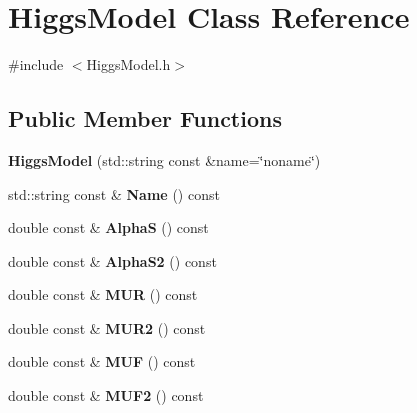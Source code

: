 \hypertarget{classHiggsModel}{}\section{Higgs\+Model Class Reference}
\label{classHiggsModel}


{\ttfamily \#include $<$Higgs\+Model.\+h$>$}

\subsection*{Public Member Functions}
\begin{DoxyCompactItemize}
\item 
\hypertarget{classHiggsModel_aa6f39f73df22008fa639fd64653cc8e2}{}{\bfseries Higgs\+Model} (std\+::string const \&name=\char`\"{}noname\char`\"{})\label{classHiggsModel_aa6f39f73df22008fa639fd64653cc8e2}

\item 
\hypertarget{classHiggsModel_a29a94aee623c9ce8d874b8b4fba17835}{}std\+::string const \& {\bfseries Name} () const \label{classHiggsModel_a29a94aee623c9ce8d874b8b4fba17835}

\item 
\hypertarget{classHiggsModel_a343a0ea0a7a22e78c3504dc64d4d6184}{}double const \& {\bfseries Alpha\+S} () const \label{classHiggsModel_a343a0ea0a7a22e78c3504dc64d4d6184}

\item 
\hypertarget{classHiggsModel_a41c108f3545d39dbb23835d781a163ee}{}double const \& {\bfseries Alpha\+S2} () const \label{classHiggsModel_a41c108f3545d39dbb23835d781a163ee}

\item 
\hypertarget{classHiggsModel_aca6071e5666fa030cacb0a11efaa1f22}{}double const \& {\bfseries M\+U\+R} () const \label{classHiggsModel_aca6071e5666fa030cacb0a11efaa1f22}

\item 
\hypertarget{classHiggsModel_a2f76729834fcbab6bb0b8c8595c05983}{}double const \& {\bfseries M\+U\+R2} () const \label{classHiggsModel_a2f76729834fcbab6bb0b8c8595c05983}

\item 
\hypertarget{classHiggsModel_a24085f73b5e2858e86db20470f8e5c9f}{}double const \& {\bfseries M\+U\+F} () const \label{classHiggsModel_a24085f73b5e2858e86db20470f8e5c9f}

\item 
\hypertarget{classHiggsModel_af636a81480654395084ead903d5ee00b}{}double const \& {\bfseries M\+U\+F2} () const \label{classHiggsModel_af636a81480654395084ead903d5ee00b}


\end{DoxyCompactItemize}
